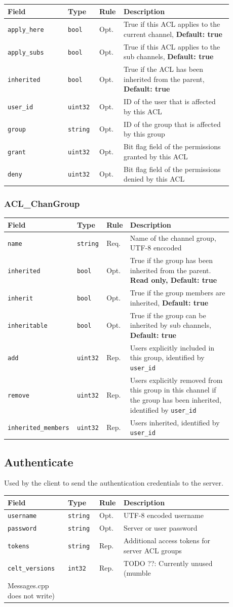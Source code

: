 \documentclass[11pt]{article} %
\newenvironment{mumbleMessageEx}
{%
	\small
	\renewcommand\arraystretch{1.5}
	\begin{tabular}{p{0.25\linewidth}p{0.13\linewidth}p{0.05\linewidth}p{0.45\linewidth}}
	Field & Type & Rule & Description \\
	\hline
}
{%
	\end{tabular}
	\renewcommand\arraystretch{1.0}
}
\newcommand{\mumbleMessageExItem}[4]{ \texttt{#1} & \texttt{#2} & #3 & #4 \\ }
\begin{document}
\begin{mumbleMessageEx}
\mumbleMessageExItem{apply\_here}{bool}{Opt.}{True if this ACL applies to the current channel, \textbf{Default: true}}
\mumbleMessageExItem{apply\_subs}{bool}{Opt.}{True if this ACL applies to the sub channels, \textbf{Default: true}}
\mumbleMessageExItem{inherited}{bool}{Opt.}{True if the ACL has been inherited from the parent, \textbf{Default: true}}
\mumbleMessageExItem{user\_id}{uint32}{Opt.}{ID of the user that is affected by this ACL}
\mumbleMessageExItem{group}{string}{Opt.}{ID of the group that is affected by this group}
\mumbleMessageExItem{grant}{uint32}{Opt.}{Bit flag field of the permissions granted by this ACL}
\mumbleMessageExItem{deny}{uint32}{Opt.}{Bit flag field of the permissions denied by this ACL}
\end{mumbleMessageEx}

\subsubsection{ACL\_ChanGroup}
\label{msg:chanGroup}

\begin{mumbleMessageEx}
\mumbleMessageExItem{name}{string}{Req.}{Name of the channel group, UTF-8 enccoded}
\mumbleMessageExItem{inherited}{bool}{Opt.}{True if the group has been inherited from the parent. \textbf{Read only, Default: true}}
\mumbleMessageExItem{inherit}{bool}{Opt.}{True if the group members are inherited, \textbf{Default: true}}
\mumbleMessageExItem{inheritable}{bool}{Opt.}{True if the group can be inherited by sub channels, \textbf{Default: true}}
\mumbleMessageExItem{add}{uint32}{Rep.}{Users explicitly included in this group, identified by \texttt{user\_id}}
\mumbleMessageExItem{remove}{uint32}{Rep.}{Users explicitly removed from this group in this channel if the group has been inherited, identified by \texttt{user\_id}}
\mumbleMessageExItem{inherited\_members}{uint32}{Rep.}{Users inherited, identified by \texttt{user\_id}}
\end{mumbleMessageEx}


\subsection{Authenticate}
\label{msg:authenticate}

Used by the client to send the authentication credentials to the server.

\begin{mumbleMessageEx}
\mumbleMessageExItem{username}{string}{Opt.}{UTF-8 encoded username}
\mumbleMessageExItem{password}{string}{Opt.}{Server or user password}
\mumbleMessageExItem{tokens}{string}{Rep.}{Additional access tokens for server ACL groups}
\mumbleMessageExItem{celt\_versions}{int32}{Rep.}{TODO ??: Currently unused (mumble\\Messages.cpp does not write)}
\end{mumbleMessageEx}
\end{document}
